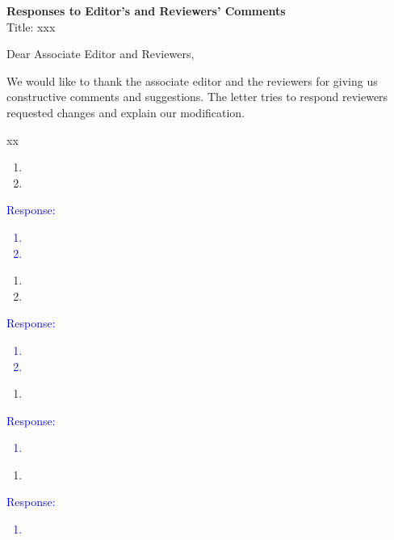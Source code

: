 \documentclass{letter}
\begin{document}
\signature{Zilong Wang}                  %
\longindentation=0pt                     %
\let\raggedleft\raggedright              %




\begin{center}
{\large  \bf{Responses to Editor's and Reviewers' Comments}} \\
\vspace{2em}
{Title: xxx} \\
\vspace{1em}
\end{center}

Dear Associate Editor and Reviewers, 

\noindent We would like to thank the associate editor and the reviewers for giving us constructive comments and suggestions. The letter tries to respond reviewers requested changes and explain our modification.

\vspace{0.1in} 

xx

\begin{enumerate}[{1.}]
\item
\item
\end{enumerate}



\textcolor{blue}{Response: 
\begin{enumerate}[{1.}]
\item 
\item
\end{enumerate}
}


\vspace{0.1in} 
\begin{enumerate}[{1.}]
\item 
\item
\end{enumerate}

\textcolor{blue}{Response:
\begin{enumerate}[{1.}]
\item 
\item
\end{enumerate}
}

\vspace{0.1in}  
\begin{enumerate}[{1.}]
\item  
\end{enumerate}

\textcolor{blue}{Response: 
\begin{enumerate}[{1.}]
\item   
\end{enumerate}
} 

\vspace{0.1in}  
\begin{enumerate}[{1.}]
\item  
\end{enumerate}

\textcolor{blue}{Response: 
\begin{enumerate}[{1.}]
\item 
\end{enumerate}
}
\end{document}
